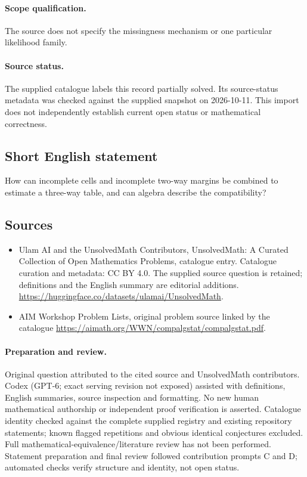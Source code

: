 \documentclass[11pt]{article}
\begin{document}
\paragraph{Scope qualification.}
The source does not specify the missingness mechanism or one particular likelihood family.
\paragraph{Source status.}
The supplied catalogue labels this record partially solved. Its source-status metadata was checked against the supplied snapshot on 2026-10-11. This import does not independently establish current open status or mathematical correctness.
\subsection{Short English statement}
How can incomplete cells and incomplete two-way margins be combined to estimate a three-way table, and can algebra describe the compatibility?
\subsection{Sources}
\begin{itemize}
\item[S1] Ulam AI and the UnsolvedMath Contributors, UnsolvedMath: A Curated Collection of Open Mathematics Problems, catalogue entry. Catalogue curation and metadata: CC BY 4.0. The supplied source question is retained; definitions and the English summary are editorial additions.
\url{https://huggingface.co/datasets/ulamai/UnsolvedMath}.
\item[S2] AIM Workshop Problem Lists, original problem source linked by the catalogue
\url{https://aimath.org/WWN/compalgstat/compalgstat.pdf}.
\end{itemize}
\paragraph{Preparation and review.}
Original question attributed to the cited source and UnsolvedMath contributors. Codex (GPT-6; exact serving revision not exposed) assisted with definitions, English summaries, source inspection and formatting. No new human mathematical authorship or independent proof verification is asserted. Catalogue identity checked against the complete supplied registry and existing repository statements; known flagged repetitions and obvious identical conjectures excluded. Full mathematical-equivalence/literature review has not been performed. Statement preparation and final review followed contribution prompts C and D; automated checks verify structure and identity, not open status.
\label{end:statement}
\end{document}
